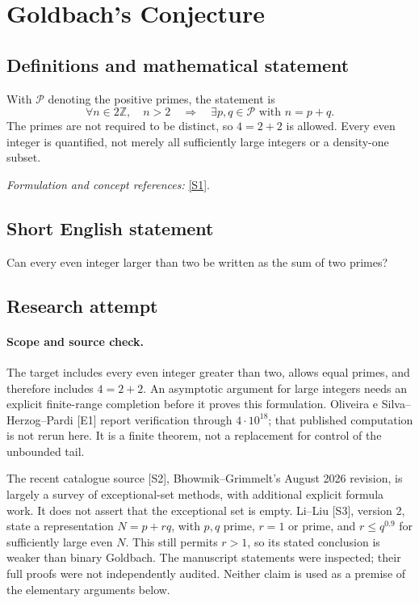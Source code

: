 \documentclass[11pt]{article}
\begin{document}
\section*{\texorpdfstring{Goldbach's Conjecture}{Goldbach's Conjecture}}\label{12}
\subsection{Definitions and mathematical statement}
With $\mathcal P$ denoting the positive primes, the statement is
\[
 \forall n\in2{\mathbb{Z}},\quad n>2\quad\Longrightarrow\quad
 \exists p,q\in\mathcal P\text{ with }n=p+q.
\]
The primes are not required to be distinct, so $4=2+2$ is allowed. Every even integer is quantified, not merely all sufficiently large integers or a density-one subset.
\par\smallskip\textit{Formulation and concept references:} \href{https://t5k.org/notes/conjectures/}{[S1]}.

\subsection{Short English statement}
Can every even integer larger than two be written as the sum of two primes?
\subsection{Research attempt}

\paragraph{Scope and source check.}
The target includes every even integer greater than two, allows equal
primes, and therefore includes $4=2+2$. An asymptotic argument for large
integers needs an explicit finite-range completion before it proves this
formulation. Oliveira e Silva--Herzog--Pardi [E1] report verification
through $4\cdot10^{18}$; that published computation is not rerun here.
It is a finite theorem, not a replacement for control of the unbounded tail.

The recent catalogue source [S2], Bhowmik--Grimmelt's August 2026 revision,
is largely a survey of exceptional-set methods, with additional explicit
formula work. It does not assert that the exceptional set is empty.
Li--Liu [S3], version 2, state a representation
$N=p+rq$, with $p,q$ prime, $r=1$ or prime, and $r\le q^{0.9}$ for
sufficiently large even $N$. This still permits $r>1$, so its stated
conclusion is weaker than binary Goldbach. The manuscript statements
were inspected; their full proofs were not independently audited.
Neither claim is used as a premise of the elementary arguments below.
\end{document}

